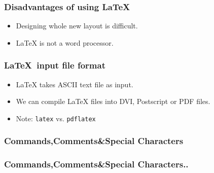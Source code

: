 \documentclass[17pt,compress]{beamer}
\newcommand{\typ}[1]{\lstinline{#1}}
\begin{document}
\begin{frame}[fragile]
  \frametitle{Disadvantages of using \LaTeX }
  \begin{itemize}
    \item Designing whole new layout is difficult.
    \item LaTeX is not a word processor.
  \end{itemize}
\end{frame}

\begin{frame}[fragile]
  \frametitle{\LaTeX \ input file format}
  \begin{itemize}
    \item \LaTeX \: takes ASCII text file as input.
    \item We can compile \LaTeX  \: files into DVI, Postscript or PDF files.
    \item \alert{Note:} \typ{latex} vs. \typ{pdflatex} 
  \end{itemize}
\end{frame}

\begin{frame}[fragile]
  \frametitle{Commands,Comments\&Special Characters }
\end{frame}

\begin{frame}[fragile]
  \frametitle{Commands,Comments\&Special Characters..}
\end{frame}
\end{document}
